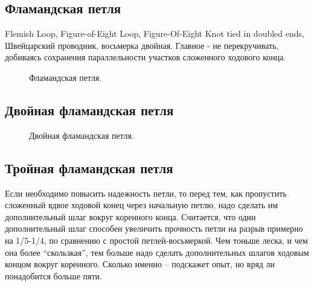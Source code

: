 \subsection{Фламандская петля}

Flemish Loop, Figure-of-Eight Loop, Figure-Of-Eight Knot tied in doubled ends, Швейцарский проводник, восьмерка двойная. Главное - не перекручивать, добиваясь сохранения параллельности участков сложенного ходового конца.

\begin{figure}[H]\centering
	\begin{minipage}{1\linewidth}
		\begin{center}
			\tcbox[enhanced jigsaw,colframe=black,opacityframe=0.5,opacityback=0.5]
			{\centering{}}
		\end{center}
	\end{minipage}
\caption{Фламандская петля.}
\label{ris:Flemish_Loop}
\end{figure}

\subsection{Двойная фламандская петля}

\begin{figure}[H]\centering
	\begin{minipage}{1\linewidth}
		\begin{center}
			\tcbox[enhanced jigsaw,colframe=black,opacityframe=0.5,opacityback=0.5]
			{\centering{}}
		\end{center}
	\end{minipage}
\caption{Двойная фламандская петля.}
\label{ris:Double_flemish_Loop}
\end{figure}

\subsection{Тройная фламандская петля}


Если необходимо повысить надежность петли, то перед тем, как пропустить сложенный вдвое ходовой конец через начальную петлю, надо сделать им дополнительный шлаг вокруг коренного конца. Считается, что один дополнительный шлаг способен увеличить прочность петли на разрыв примерно на 1/5-1/4, по сравнению с простой петлей-восьмеркой. Чем тоньше леска, и чем она более \enquote{скользкая}, тем больше надо сделать дополнительных шлагов ходовым концом вокруг коренного. Сколько именно -- подскажет опыт, но вряд ли понадобится больше пяти.

